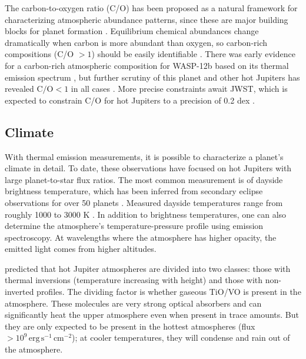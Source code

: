 \documentclass[graybox,natbib,nosecnum]{svmult}
\begin{document}
The carbon-to-oxygen ratio (C/O) has been proposed as a natural framework for characterizing atmospheric abundance patterns, since these are major building blocks for planet formation \citep{madhusudhan12}.  Equilibrium chemical abundances change dramatically when carbon is more abundant than oxygen, so carbon-rich compositions (C/O $> 1$) should be easily identifiable \citep{moses13}.  There was early evidence for a carbon-rich atmospheric composition for WASP-12b based on its thermal emission spectrum \citep{madhusudhan11}, but further scrutiny of this planet and other hot Jupiters has revealed $\mathrm{C/O} < 1$ in all cases \citep{line14, kreidberg15b, benneke15, barstow17}. More precise constraints await JWST, which is expected to constrain C/O for hot Jupiters to a precision of 0.2 dex \citep{greene16}.

\subsection{Climate}
With thermal emission measurements, it is possible to characterize a planet's climate in detail.  To date, these observations have focused on hot Jupiters with large planet-to-star flux ratios. The most common measurement is of dayside brightness temperature, which has been inferred from secondary eclipse observations for over 50 planets \citep{schwartz15}. Measured dayside temperatures range from roughly 1000 to 3000 K \citep{stevenson14b, kammer15, morley17}.  In addition to brightness temperatures, one can also determine the atmosphere's temperature-pressure profile using emission spectroscopy. At wavelengths where the atmosphere has higher opacity, the emitted light comes from higher altitudes. 

\cite{fortney08} predicted that hot Jupiter atmospheres are divided into two classes: those with thermal inversions (temperature increasing with height) and those with non-inverted profiles. The dividing factor is whether gaseous TiO/VO is present in the atmosphere. These molecules are very strong optical absorbers and can significantly heat the upper atmosphere even when present in trace amounts. But they are only expected to be present in the hottest atmospheres (flux $>10^9\,\mathrm{erg}\,\mathrm{s}^{-1}\,\mathrm{cm}^{-2}$); at cooler temperatures, they will condense and rain out of the atmosphere.
\end{document}
